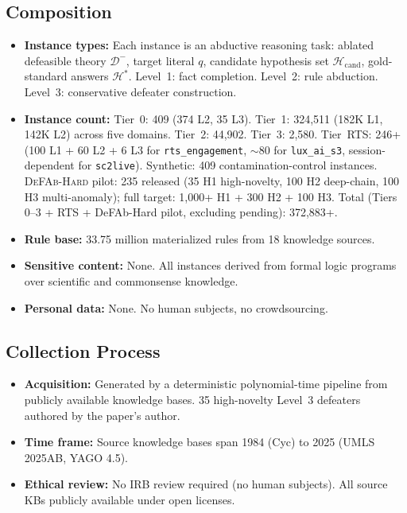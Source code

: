 \documentclass{article}
\theoremstyle{definition}
\newcommand{\Dm}{\mathcal{D}^{-}}
\newcommand{\Hcand}{\mathcal{H}_{\mathrm{cand}}}
\newcommand{\Hgold}{\mathcal{H}^{*}}
\begin{document}
\subsection*{Composition}

\begin{itemize}[nosep]
\item \textbf{Instance types:} Each instance is an abductive reasoning task: ablated defeasible theory $\Dm$, target literal $q$, candidate hypothesis set $\Hcand$, gold-standard answers $\Hgold$. Level~1: fact completion. Level~2: rule abduction. Level~3: conservative defeater construction.
\item \textbf{Instance count:} Tier~0: 409 (374 L2, 35 L3). Tier~1: 324,511 (182K L1, 142K L2) across five domains. Tier~2: 44,902. Tier~3: 2,580. Tier~RTS: 246+ (100 L1 + 60 L2 + 6 L3 for \texttt{rts\_engagement}, $\sim$80 for \texttt{lux\_ai\_s3}, session-dependent for \texttt{sc2live}). Synthetic: 409 contamination-control instances. \textsc{DeFAb-Hard} pilot: 235 released (35 H1 high-novelty, 100 H2 deep-chain, 100 H3 multi-anomaly); full target: 1{,}000+ H1 + 300 H2 + 100 H3. Total (Tiers 0--3 + RTS + DeFAb-Hard pilot, excluding pending): 372,883+.
\item \textbf{Rule base:} 33.75 million materialized rules from 18 knowledge sources.
\item \textbf{Sensitive content:} None. All instances derived from formal logic programs over scientific and commonsense knowledge.
\item \textbf{Personal data:} None. No human subjects, no crowdsourcing.
\end{itemize}

\subsection*{Collection Process}

\begin{itemize}[nosep]
\item \textbf{Acquisition:} Generated by a deterministic polynomial-time pipeline from publicly available knowledge bases. 35 high-novelty Level~3 defeaters authored by the paper's author.
\item \textbf{Time frame:} Source knowledge bases span 1984 (Cyc) to 2025 (UMLS 2025AB, YAGO 4.5).
\item \textbf{Ethical review:} No IRB review required (no human subjects). All source KBs publicly available under open licenses.
\end{itemize}
\end{document}
